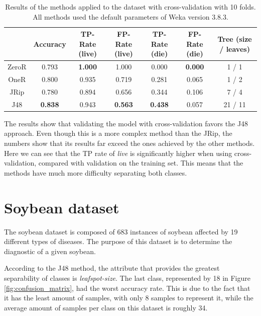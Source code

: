 \documentclass{article}
\begin{document}
\begin{table}[htp]
    \begin{tabular}{c|c|c|c|c|c|c}
         & Accuracy & TP-Rate (live) & FP-Rate (live) & TP-Rate (die) & FP-Rate (die) & Tree (size / leaves) \\ \hline
         ZeroR & 0.793 & \textbf{1.000} & 1.000 & 0.000 & \textbf{0.000} & 1 / 1 \\
         OneR & 0.800 & 0.935 & 0.719 &  0.281 & 0.065 & 1 / 2 \\
         JRip & 0.780 & 0.894 & 0.656 & 0.344 & 0.106 & 7 / 4 \\
         J48 & \textbf{0.838} & 0.943 & \textbf{0.563} & \textbf{0.438} & 0.057 & 21 / 11 \\
    \end{tabular}
    \caption{Results of the methods applied to the dataset with cross-validation with 10 folds. All methods used the default parameters of Weka version 3.8.3.}
    \label{tab:cross_validation}
\end{table}

The results show that validating the model with cross-validation favors the J48 approach. Even though this is a more complex method than the JRip, the numbers show that its results far exceed the ones achieved by the other methods. Here we can see that the TP rate of \textit{live} is significantly higher when using cross-validation, compared with validation on the training set. This means that the methods have much more difficulty separating both classes.


\section*{Soybean dataset}

The soybean dataset is composed of 683 instances of soybean affected by 19 different types of diseases. The purpose of this dataset is to determine the diagnostic of a given soybean. 

According to the J48 method, the attribute that provides the greatest separability of classes is \textit{leafspot-size}. The last class, represented by 18 in Figure \ref{fig:confusion_matrix}, had the worst accuracy rate. This is due to the fact that it has the least amount of samples, with only 8 samples to represent it, while the average amount of samples per class on this dataset is roughly 34.
\end{document}
